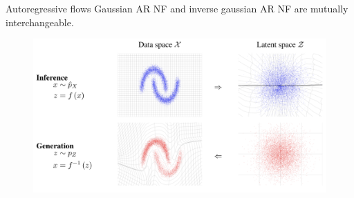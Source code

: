 \documentclass{beamer}
\begin{document}
\begin{frame}{Autoregressive flows}
	Gaussian AR NF and inverse gaussian AR NF are mutually interchangeable. 
	\begin{figure}
		\includegraphics[width=\linewidth]{figs/flows_how2.png}
	\end{figure}
	
\end{frame}
\end{document}
